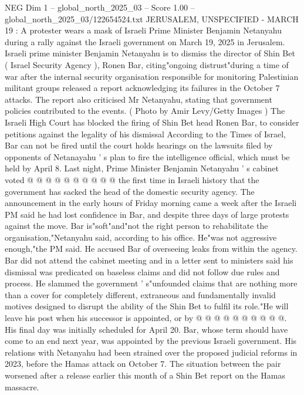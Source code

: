 \begin{textsample}{NEG Dim 1 – global\_north\_2025\_03 – Score 1.00 – global\_north\_2025\_03/122654524.txt}  \label{ex:f1_neg_055}
JERUSALEM, UNSPECIFIED - MARCH 19 : A protester wears a mask of Israeli Prime Minister Benjamin Netanyahu during a rally against the Israeli government on March 19, 2025 in Jerusalem.
Israeli prime minister Benjamin Netanyahu is to dismiss the director of Shin Bet ( Israel Security Agency ), Ronen Bar, citing"ongoing distrust"during a time of war after the internal security organisation responsible for monitoring Palestinian militant groups released a report acknowledging its failures in the October 7 attacks.
The report also criticised Mr Netanyahu, stating that government policies contributed to the events. ( Photo by Amir Levy/Getty Images ) The Israeli High Court has blocked the firing of Shin Bet head Ronen Bar, to consider petitions against the legality of his dismissal According to the Times of Israel, Bar can not be fired until the court holds hearings on the lawsuits filed by opponents of Netanayahu ' s plan to fire the intelligence official, which must be held by April 8.
Last night, Prime Minister Benjamin Netanyahu ' s cabinet voted @ @ @ @ @ @ @ @ @ @ the first time in Israeli history that the government has sacked the head of the domestic security agency.
The announcement in the early hours of Friday morning came a week after the Israeli PM said he had lost confidence in Bar, and despite three days of large protests against the move.
Bar is"soft"and"not the right person to rehabilitate the organisation,"Netanyahu said, according to his office.
He"was not aggressive enough,"the PM said.
He accused Bar of overseeing leaks from within the agency.
Bar did not attend the cabinet meeting and in a letter sent to ministers said his dismissal was predicated on baseless claims and did not follow due rules and process.
He slammed the government ' s"unfounded claims that are nothing more than a cover for completely different, extraneous and fundamentally invalid motives designed to disrupt the ability of the Shin Bet to fulfil its role."He will leave his post when his successor is appointed, or by @ @ @ @ @ @ @ @ @ @.
His final day was initially scheduled for April 20.
Bar, whose term should have come to an end next year, was appointed by the previous Israeli government.
His relations with Netanyahu had been strained over the proposed judicial reforms in 2023, before the Hamas attack on October 7.
The situation between the pair worsened after a release earlier this month of a Shin Bet report on the Hamas massacre.

\end{textsample}
